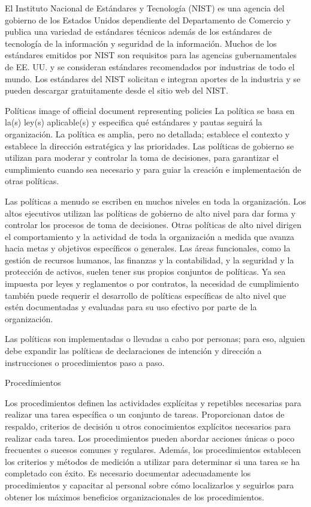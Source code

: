 El Instituto Nacional de Estándares y Tecnología (NIST) es una agencia del gobierno de los Estados Unidos dependiente del Departamento de Comercio y publica una variedad de estándares técnicos además de los estándares de tecnología de la información y seguridad de la información. Muchos de los estándares emitidos por NIST son requisitos para las agencias gubernamentales de EE. UU. y se consideran estándares recomendados por industrias de todo el mundo. Los estándares del NIST solicitan e integran aportes de la industria y se pueden descargar gratuitamente desde el sitio web del NIST.

Políticas
image of official document representing policies
La política se basa en la(s) ley(s) aplicable(s) y especifica qué estándares y pautas seguirá la organización. La política es amplia, pero no detallada; establece el contexto y establece la dirección estratégica y las prioridades. Las políticas de gobierno se utilizan para moderar y controlar la toma de decisiones, para garantizar el cumplimiento cuando sea necesario y para guiar la creación e implementación de otras políticas.

Las políticas a menudo se escriben en muchos niveles en toda la organización. Los altos ejecutivos utilizan las políticas de gobierno de alto nivel para dar forma y controlar los procesos de toma de decisiones. Otras políticas de alto nivel dirigen el comportamiento y la actividad de toda la organización a medida que avanza hacia metas y objetivos específicos o generales. Las áreas funcionales, como la gestión de recursos humanos, las finanzas y la contabilidad, y la seguridad y la protección de activos, suelen tener sus propios conjuntos de políticas. Ya sea impuesta por leyes y reglamentos o por contratos, la necesidad de cumplimiento también puede requerir el desarrollo de políticas específicas de alto nivel que estén documentadas y evaluadas para su uso efectivo por parte de la organización.

Las políticas son implementadas o llevadas a cabo por personas; para eso, alguien debe expandir las políticas de declaraciones de intención y dirección a instrucciones o procedimientos paso a paso.

Procedimientos


Los procedimientos definen las actividades explícitas y repetibles necesarias para realizar una tarea específica o un conjunto de tareas. Proporcionan datos de respaldo, criterios de decisión u otros conocimientos explícitos necesarios para realizar cada tarea. Los procedimientos pueden abordar acciones únicas o poco frecuentes o sucesos comunes y regulares. Además, los procedimientos establecen los criterios y métodos de medición a utilizar para determinar si una tarea se ha completado con éxito. Es necesario documentar adecuadamente los procedimientos y capacitar al personal sobre cómo localizarlos y seguirlos para obtener los máximos beneficios organizacionales de los procedimientos.



